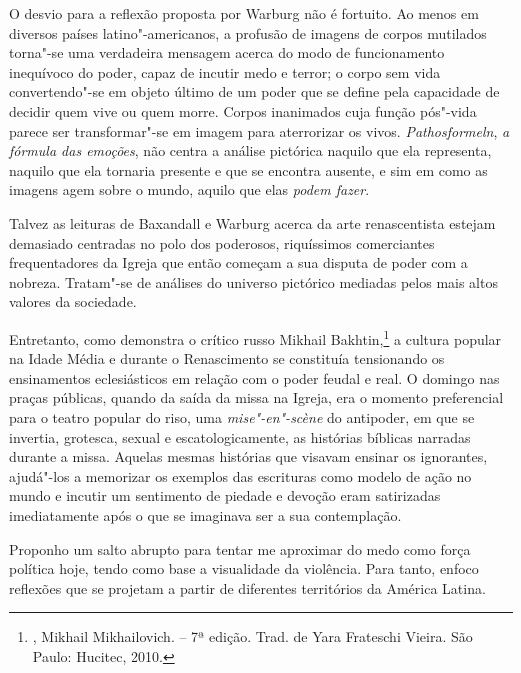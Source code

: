 O desvio para a reflexão proposta por Warburg não é fortuito. Ao menos
em diversos países latino"-americanos, a profusão de imagens de corpos
mutilados torna"-se uma verdadeira mensagem acerca do modo de
funcionamento inequívoco do poder, capaz de incutir medo e terror; o
corpo sem vida convertendo"-se em objeto último de um poder que se define
pela capacidade de decidir quem vive ou quem morre. Corpos inanimados
cuja função pós"-vida parece ser transformar"-se em imagem para
aterrorizar os vivos. \emph{Pathosformeln}, \emph{a fórmula das
emoções}, não centra a análise pictórica naquilo que ela representa,
naquilo que ela tornaria presente e que se encontra ausente, e sim em
como as imagens agem sobre o mundo, aquilo que elas \emph{podem fazer}.

\asterisc

Talvez as leituras de Baxandall e Warburg acerca da arte renascentista
estejam demasiado centradas no polo dos poderosos, riquíssimos
comerciantes frequentadores da Igreja que então começam a sua disputa de
poder com a nobreza. Tratam"-se de análises do universo pictórico
mediadas pelos mais altos valores da sociedade.

Entretanto, como demonstra o crítico russo Mikhail Bakhtin,\footnote{, Mikhail Mikhailovich. {} -- 7ª edição. Trad. de Yara Frateschi Vieira. São Paulo: Hucitec, 2010.} a cultura
popular na Idade Média e durante o Renascimento se constituía
tensionando os ensinamentos eclesiásticos em relação com o poder feudal
e real. O domingo nas praças públicas, quando da saída da missa na
Igreja, era o momento preferencial para o teatro popular do riso, uma
\emph{mise"-en"-scène} do antipoder, em que se invertia, grotesca, sexual e
escatologicamente, as histórias bíblicas narradas
durante a missa. Aquelas mesmas histórias que visavam ensinar os ignorantes,
ajudá"-los a memorizar os exemplos das escrituras como modelo de ação no
mundo e incutir um sentimento de piedade e devoção eram satirizadas
imediatamente após o que se imaginava ser a sua contemplação.

\asterisc

Proponho um salto abrupto para tentar me aproximar do medo como força política hoje,
tendo como base a visualidade da violência. Para tanto, enfoco reflexões
que se projetam a partir de diferentes territórios da América Latina.

